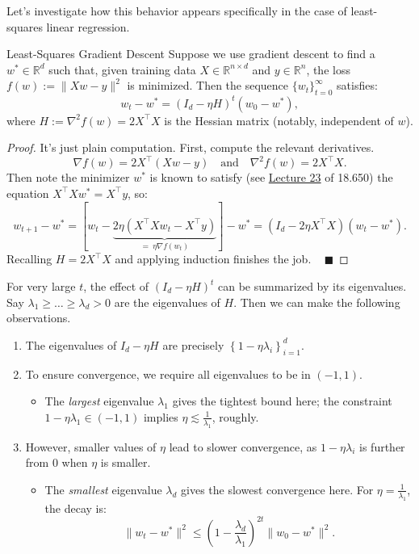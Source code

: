 Let's investigate how this behavior appears
specifically in the case of least-squares linear regression.

\begin{theorem}{Least-Squares Gradient Descent}
    Suppose we use gradient descent to find
    a $w^* \in \mathbb{R}^d$ such that,
    given training data $X \in \mathbb{R}^{n \times d}$
    and $y \in \mathbb{R}^n$,
    the loss $f(w) := \|Xw - y\|^2$ is minimized.
    Then the sequence $\{w_t\}_{t = 0}^{\infty}$ satisfies:
    \[ w_t - w^* = (I_d - \eta H)^t (w_0 - w^*), \]
    where $H := \nabla^2 f(w) = 2X^{\top}X$
    is the Hessian matrix (notably, independent of $w$).
\end{theorem}

\begin{proof}
    It's just plain computation.
    First, compute the relevant derivatives.
    \[ \nabla f(w) = 2X^{\top}(Xw - y)
    ~~~ \text{ and } ~~~
    \nabla^2 f(w) = 2X^{\top}X. \]
    Then note the minimizer $w^*$ is known to satisfy
    (see \href{/18.650/lectures/23/#least-squares-loss}{Lecture 23}
    of 18.650) the equation $X^{\top}Xw^* = X^{\top}y$, so:
    \[ w_{t + 1} - w^*
    = \left[w_t - \underbrace{2 \eta \left(
        X^{\top}X w_t - X^{\top}y
    \right)}_{
        = \ \eta \nabla f(w_t)
    }\right] - w^*
    = \left(I_d - 2 \eta X^{\top}X\right)(w_t - w^*). \]
    Recalling $H = 2X^{\top}X$ and applying induction
    finishes the job. ~ $\blacksquare$
\end{proof}

For very large $t$, the effect of $(I_d - \eta H)^t$
can be summarized by its eigenvalues.
Say $\lambda_1 \geq \dots \geq \lambda_d > 0$
are the eigenvalues of $H$.
Then we can make the following observations.
\begin{enumerate}
    \item The eigenvalues of $I_d - \eta H$
    are precisely $\left\{1 - \eta \lambda_i\right\}_{i = 1}^d$.
    \item To ensure convergence,
    we require all eigenvalues to be in $(-1, 1)$.
    \begin{itemize}
        \item The \emph{largest} eigenvalue $\lambda_1$
        gives the tightest bound here;
        the constraint $1 - \eta \lambda_1 \in (-1, 1)$
        implies $\eta \lesssim \frac{1}{\lambda_1}$, roughly.
    \end{itemize}
    \item However, smaller values of $\eta$
    lead to slower convergence, as
    $1 - \eta \lambda_i$ is further from $0$
    when $\eta$ is smaller.
    \begin{itemize}
        \item The \emph{smallest} eigenvalue $\lambda_d$
        gives the slowest convergence here.
        For $\eta = \frac{1}{\lambda_1}$, the decay is:
        \[ \|w_t - w^*\|^2
        \leq \left(1 - \frac{\lambda_d}{\lambda_1}\right)^{2t}
        \|w_0 - w^*\|^2. \]
    \end{itemize}
\end{enumerate}

